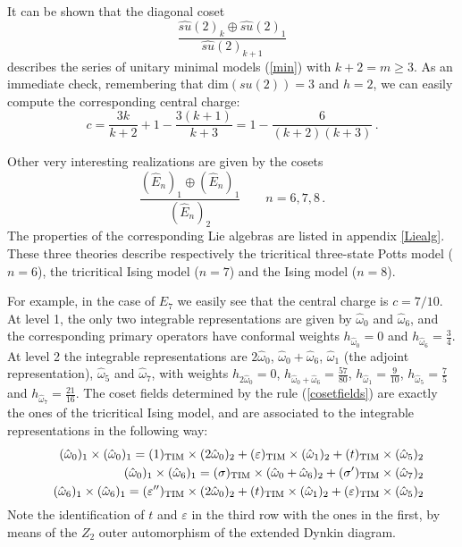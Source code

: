 \documentclass[a4paper,12pt]{report}
\begin{document}
It can be shown that the diagonal coset
\begin{equation}
\frac{\widehat{su}(2)_{k}\oplus\widehat{su}(2)_{1}}{\widehat{su}(2)_{k+1}}
\end{equation}
describes the series of unitary minimal models (\ref{min}) with $k+2=m\geq 3$. As an immediate check, remembering
that $\textrm{dim}(su(2))=3$ and $h=2$, we can easily compute the corresponding central charge:
\begin{equation}
c=\frac{3k}{k+2}+1-\frac{3(k+1)}{k+3}=1-\frac{6}{(k+2)(k+3)}\,.
\end{equation}

\vspace{0.5cm}

Other very interesting realizations are given by the cosets
\begin{equation}
\frac{(\widehat{E}_{n})_{1}\oplus(\widehat{E}_{n})_{1}}{(\widehat{E}_{n})_{2}}\qquad n=6,7,8\,.
\end{equation}
The properties of the corresponding Lie algebras are listed in appendix \ref{Liealg}. These three theories
describe respectively the tricritical three-state Potts model ($n=6$), the tricritical Ising model ($n=7$) and
the Ising model ($n=8$).

For example, in the case of $E_{7}$ we easily see that the central charge is $c=7/10$. At level 1, the only two
integrable representations are given by $\hat{\omega}_{0}$ and $\hat{\omega}_{6}$, and the corresponding primary
operators have conformal weights $h_{\hat{\omega}_{0}}=0$ and $h_{\hat{\omega}_{6}}=\frac{3}{4}$. At level 2 the
integrable representations are $2\hat{\omega}_{0}$, $\hat{\omega}_{0}+\hat{\omega}_{6}$, $\hat{\omega}_{1}$ (the
adjoint representation), $\hat{\omega}_{5}$ and $\hat{\omega}_{7}$, with weights $h_{2\hat{\omega}_{0}}=0$,
$h_{\hat{\omega}_{0}+\hat{\omega}_{6}}=\frac{57}{80}$, $h_{\hat{\omega}_{1}}=\frac{9}{10}$,
$h_{\hat{\omega}_{5}}=\frac{7}{5}$ and $h_{\hat{\omega}_{7}}=\frac{21}{16}$. The coset fields determined by the
rule (\ref{cosetfields}) are exactly the ones of the tricritical Ising model, and are associated to the
integrable representations in the following way:
\begin{eqnarray*}
&&(\hat{\omega}_{0})_{1}\times(\hat{\omega}_{0})_{1}=(1)_{\tiny\textrm{TIM}}\times(2\hat{\omega}_{0})_{2}+(\varepsilon)_{\tiny\textrm{TIM}}\times(\hat{\omega}_{1})_{2}+(t)_{\tiny\textrm{TIM}}\times(\hat{\omega}_{5})_{2}\\
&&(\hat{\omega}_{0})_{1}\times(\hat{\omega}_{6})_{1}=(\sigma)_{\tiny\textrm{TIM}}\times(\hat{\omega}_{0}+\hat{\omega}_{6})_{2}+(\sigma')_{\tiny\textrm{TIM}}\times(\hat{\omega}_{7})_{2}\\
&&(\hat{\omega}_{6})_{1}\times(\hat{\omega}_{6})_{1}=(\varepsilon'')_{\tiny\textrm{TIM}}\times(2\hat{\omega}_{0})_{2}+(t)_{\tiny\textrm{TIM}}\times(\hat{\omega}_{1})_{2}+(\varepsilon)_{\tiny\textrm{TIM}}\times(\hat{\omega}_{5})_{2}
\end{eqnarray*}
Note the identification of $t$ and $\varepsilon$ in the third row with the ones in the first, by means of the
$Z_{2}$ outer automorphism of the extended Dynkin diagram.
\end{document}
